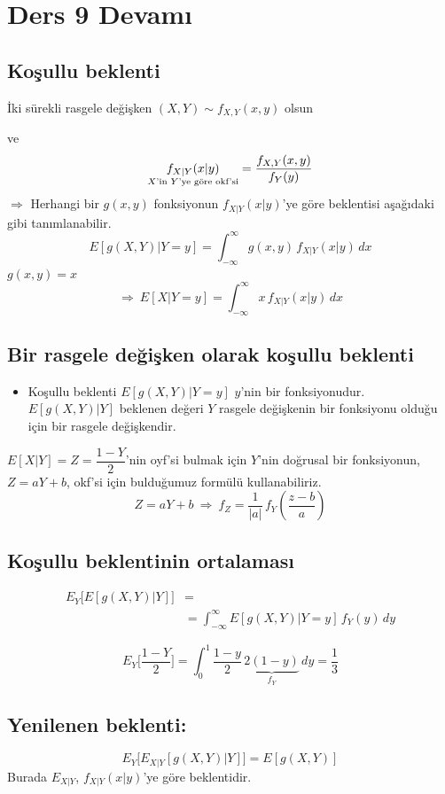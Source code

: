 \documentclass[11pt,a4paper]{article}
\begin{document}
\section{Ders 9 Devamı}
\subsection{Koşullu beklenti}
İki sürekli rasgele değişken $(X,Y)\sim f_{X,Y}(x,y)$ olsun

ve
\[ \underset{\text{\scriptsize $X$'in $Y$'ye göre okf'si}}{f_{X|Y}(x|y)}=\frac{f_{X,Y}(x,y)}{f_Y(y)} \]
$\Rightarrow$ Herhangi bir $g(x,y)$ fonksiyonun $f_{X|Y}(x|y)$'ye göre beklentisi aşağıdaki gibi tanımlanabilir.
\[ E[g(X,Y)|Y=y]=\int_{-\infty}^{\infty}g(x,y)\,f_{X|Y}(x|y)\,dx \]
$g(x,y)=x$
\[ \Rightarrow\ E[X|Y=y]=\int_{-\infty}^{\infty}x\,f_{X|Y}(x|y)\,dx \]

\subsection{Bir rasgele değişken olarak koşullu beklenti}
\begin{itemize}
  \item Koşullu beklenti $E[g(X,Y)|Y=y]$ $y$'nin bir fonksiyonudur. $E[g(X,Y)|Y]$ beklenen değeri $Y$ rasgele değişkenin bir fonksiyonu olduğu için bir rasgele değişkendir.
\end{itemize}
$E[X|Y]=Z=\dfrac{1-Y}{2}$'nin oyf'si bulmak için $Y$'nin doğrusal bir fonksiyonun, $Z=aY+b$, okf'si için bulduğumuz formülü kullanabiliriz.
\[ Z=aY+b\ \Rightarrow\ f_Z=\frac{1}{|a|}\,f_Y\!\left(\frac{z-b}{a}\right) \]

\subsection{Koşullu beklentinin ortalaması}
\begin{align*}
  E_Y\big[E[g(X,Y)|Y]\big] &=\\
  &=\int_{-\infty}^{\infty}E[g(X,Y)|Y=y]\,f_Y(y)\,dy
\end{align*}
\begin{ornek}
  \[ E_Y\Big[\frac{1-Y}{2}\Big]=\int_{0}^{1}\frac{1-y}{2}\,\underbrace{2(1-y)}_{f_Y}\,dy=\frac{1}{3} \]
\end{ornek}

\subsection{Yenilenen beklenti:}
\[ E_Y\big[E_{X|Y}[g(X,Y)|Y]\big]=E[g(X,Y)] \]
Burada $E_{X|Y}$, $f_{X|Y}(x|y)$'ye göre beklentidir.
\end{document}
